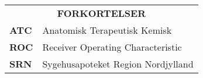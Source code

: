 \begin{table}[H]
\label{table:forkortelser}
\begin{tabular}{p{4.5cm} p{9.8cm}}
\multicolumn{2}{c}{\cellcolor[HTML]{C0C0C0}\textbf{ FORKORTELSER}} \vspace{0.2cm} \\
\textbf{ATC} &  Anatomisk Terapeutisk Kemisk \vspace{0.2cm} \\
\textbf{ROC} & Receiver Operating Characteristic \vspace{0.2cm} \\
\textbf{SRN} & Sygehusapoteket Region Nordjylland \vspace{0.2cm} \\
\end{tabular}
\end{table}
\vspace{-0.8cm}

